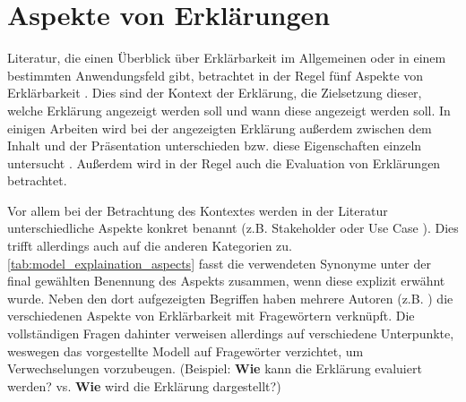 \section{Aspekte von Erklärungen}
\label{sec:model_explanation_aspects}

Literatur, die einen Überblick über Erklärbarkeit im Allgemeinen oder in einem bestimmten Anwendungsfeld gibt, betrachtet in der Regel fünf Aspekte von Erklärbarkeit \cite{rosenfeld_explainability_2019, nunes_systematic_2017,chazette_knowledge_nodate}. Dies sind der Kontext der Erklärung, die Zielsetzung dieser, welche Erklärung angezeigt werden soll und wann diese angezeigt werden soll. In einigen Arbeiten wird bei der angezeigten Erklärung außerdem zwischen dem Inhalt und der Präsentation unterschieden bzw. diese Eigenschaften einzeln untersucht \cite{nunes_systematic_2017,abdulrahman_belief-based_2019}. Außerdem wird in der Regel auch die Evaluation von Erklärungen betrachtet.

Vor allem bei der Betrachtung des Kontextes werden in der Literatur unterschiedliche Aspekte konkret benannt (z.B. \glqq Stakeholder\grqq{} \cite{rosenfeld_explainability_2019} oder \glqq Use Case\grqq{} \cite{waa_evaluating_2021}). Dies trifft allerdings auch auf die anderen Kategorien zu. \autoref{tab:model_explaination_aspects} fasst die verwendeten Synonyme unter der final gewählten Benennung des Aspekts zusammen, wenn diese explizit erwähnt wurde. Neben den dort aufgezeigten Begriffen haben mehrere Autoren (z.B. \cite{rosenfeld_explainability_2019, chazette2020explainability}) die verschiedenen Aspekte von Erklärbarkeit mit Fragewörtern verknüpft. Die vollständigen Fragen dahinter verweisen allerdings auf verschiedene Unterpunkte, weswegen das vorgestellte Modell auf Fragewörter verzichtet, um Verwechselungen vorzubeugen. (Beispiel: \glqq \textbf{Wie} kann die Erklärung evaluiert werden?\grqq \cite{rosenfeld_explainability_2019} vs. \glqq \textbf{Wie} wird die Erklärung dargestellt?\grqq \cite{})

